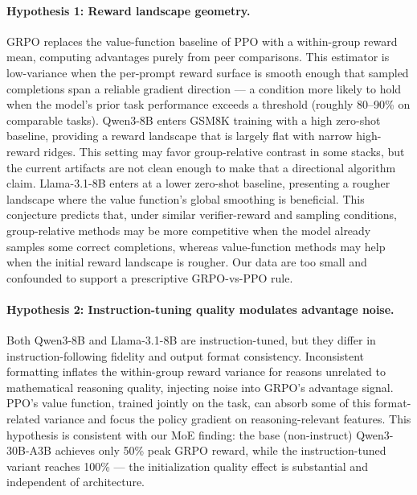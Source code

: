 \paragraph{Hypothesis 1: Reward landscape geometry.}
GRPO replaces the value-function baseline of PPO with a within-group reward
mean, computing advantages purely from peer comparisons.
This estimator is low-variance when the per-prompt reward surface is smooth
enough that sampled completions span a reliable gradient direction --- a
condition more likely to hold when the model's prior task performance exceeds a
threshold (roughly 80--90\% on comparable tasks).
Qwen3-8B enters GSM8K training with a high zero-shot baseline, providing a
reward landscape that is largely flat with narrow high-reward ridges.  This
setting may favor group-relative contrast in some stacks, but the current
artifacts are not clean enough to make that a directional algorithm claim.
Llama-3.1-8B enters at a lower zero-shot baseline, presenting a rougher
landscape where the value function's global smoothing is beneficial.
This conjecture predicts that, under similar verifier-reward and sampling
conditions, group-relative methods may be more competitive when the model
already samples some correct completions, whereas value-function methods may
help when the initial reward landscape is rougher. Our data are too small and
confounded to support a prescriptive GRPO-vs-PPO rule.

\paragraph{Hypothesis 2: Instruction-tuning quality modulates advantage noise.}
Both Qwen3-8B and Llama-3.1-8B are instruction-tuned, but they differ in
instruction-following fidelity and output format consistency.
Inconsistent formatting inflates the within-group reward variance for reasons
unrelated to mathematical reasoning quality, injecting noise into GRPO's
advantage signal.
PPO's value function, trained jointly on the task, can absorb some of this
format-related variance and focus the policy gradient on reasoning-relevant
features.
This hypothesis is consistent with our MoE finding: the base (non-instruct)
Qwen3-30B-A3B achieves only 50\% peak GRPO reward, while the instruction-tuned
variant reaches 100\% --- the initialization quality effect is substantial and
independent of architecture.

